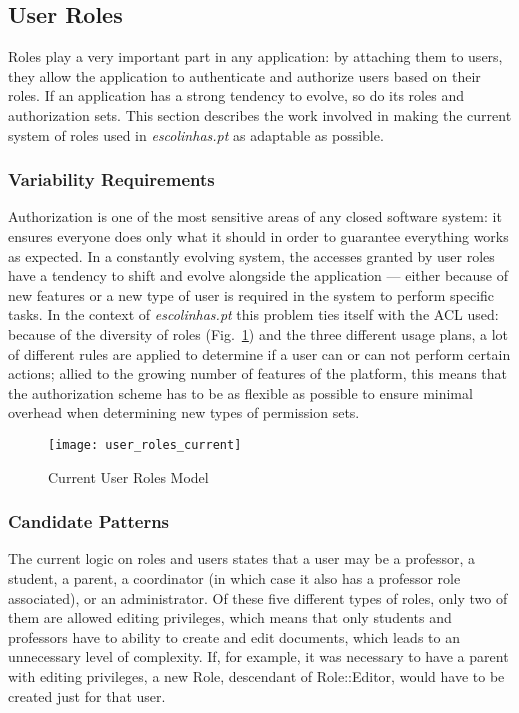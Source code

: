 \subsection{User Roles}\label{sec:fa_roles}

Roles play a very important part in any application: by attaching them to users, they allow the application to authenticate and authorize users based on their roles. If an application has a strong tendency to evolve, so do its roles and authorization sets. This section describes the work involved in making the current system of roles used in \emph{escolinhas.pt} as adaptable as possible.

\subsubsection{Variability Requirements}\label{sec:fa_roles_variability_requirements}

Authorization is one of the most sensitive areas of any closed software system: it ensures everyone does only what it should in order to guarantee everything works as expected. In a constantly evolving system, the accesses granted by user roles have a tendency to shift and evolve alongside the application --- either because of new features or a new type of user is required in the system to perform specific tasks. In the context of \emph{escolinhas.pt} this problem ties itself with the ACL used: because of the diversity of roles (Fig.~\ref{fig:user_roles_current}) and the three different usage plans, a lot of different rules are applied to determine if a user can or can not perform certain actions; allied to the growing number of features of the platform, this means that the authorization scheme has to be as flexible as possible to ensure minimal overhead when determining new types of permission sets.

\begin{figure}[h]
  \centering
  \texttt{[image: user\_roles\_current]}
  \caption{Current User Roles Model}
  \label{fig:user_roles_current}
\end{figure}

\subsubsection{Candidate Patterns}\label{sec:fa_roles_candidate_patterns}

The current logic on roles and users states that a user may be a professor, a student, a parent, a coordinator (in which case it also has a professor role associated), or an administrator. Of these five different types of roles, only two of them are allowed editing privileges, which means that only students and professors have to ability to create and edit documents, which leads to an unnecessary level of complexity. If, for example, it was necessary to have a parent with editing privileges, a new Role, descendant of Role::Editor, would have to be created just for that user.

